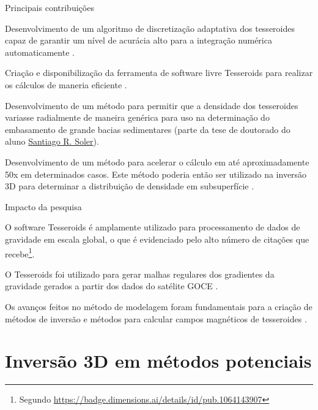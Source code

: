 \documentclass[10pt,a4paper,oneside]{book}
\newcommand{\SantiagoLink}{\href{https://www.santisoler.com/}{Santiago R. Soler}}
\begin{document}
\begin{fancyenum}{\faLightbulb}{Principais contribuições}
  \item Desenvolvimento de um algoritmo de discretização adaptativa dos
    tesseroides capaz de garantir um nível de acurácia alto para a integração
    numérica automaticamente \citep{Uieda2016}.
  \item Criação e disponibilização da ferramenta de software livre Tesseroids
    para realizar os cálculos de maneria eficiente \citep{Uieda2016}.
  \item Desenvolvimento de um método para permitir que a densidade dos
    tesseroides variasse radialmente de maneira genérica \citep{Soler2019}
    para uso na determinação do embasamento de grande bacias sedimentares
    (parte da tese de doutorado do aluno \SantiagoLink{}).
  \item Desenvolvimento de um método para acelerar o cálculo
    em até aproximadamente 50x em determinados casos. Este método poderia então
    ser utilizado na inversão 3D para determinar a distribuição de densidade em
    subsuperfície \citep[][em colaboração com pesquisadores da Central
    South University, China, e GFZ Potsdam, Alemanha]{Zhao2019} .
\end{fancyenum}

\begin{fancyenum}{\faRocket}{Impacto da pesquisa}
  \item O software Tesseroids é amplamente utilizado para processamento de
    dados de gravidade em escala global, o que é evidenciado pelo alto número
    de citações que recebe\footnote{Segundo
    \url{https://badge.dimensions.ai/details/id/pub.1064143907}}.
  \item O Tesseroids foi utilizado para gerar malhas regulares dos gradientes da
    gravidade gerados a partir dos dados do satélite GOCE \citep{Bouman2016}.
  \item Os avanços feitos no método de modelagem foram fundamentais para a
    criação de métodos de inversão \citep{Uieda2017,Zhao2019} e métodos para
    calcular campos magnéticos de tesseroides \citep{Baykiev2016}.
\end{fancyenum}



\section{Inversão 3D em métodos potenciais}
\label{sec_planting}
\end{document}
